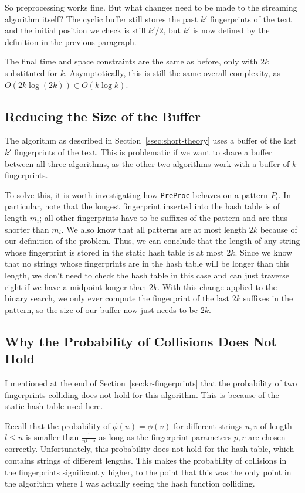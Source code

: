 \documentclass[ %
                    author={Dominic Joseph Moylett},
                    degree={MEng},
                     title={Dictionary Matching with Fingerprints},
                  subtitle={An Empirical Analysis},
                      type={research},
                      year={2015} ]{dissertation}
\begin{document}
So preprocessing works fine. But what changes need to be made to the streaming algorithm itself? The cyclic buffer still stores the past $k'$ fingerprints of the text and the initial position we check is still $k'/2$, but $k'$ is now defined by the definition in the previous paragraph.

The final time and space constraints are the same as before, only with $2k$ substituted for $k$. Asymptotically, this is still the same overall complexity, as $O(2k\log(2k)) \in O(k\log k)$.

\subsection{Reducing the Size of the Buffer}

The algorithm as described in Section~\ref{ssec:short-theory} uses a buffer of the last $k'$ fingerprints of the text. This is problematic if we want to share a buffer between all three algorithms, as the other two algorithms work with a buffer of $k$ fingerprints.

To solve this, it is worth investigating how \texttt{PreProc} behaves on a pattern $P_i$. In particular, note that the longest fingerprint inserted into the hash table is of length $m_i$; all other fingerprints have to be suffixes of the pattern and are thus shorter than $m_i$. We also know that all patterns are at most length $2k$ because of our definition of the problem. Thus, we can conclude that the length of any string whose fingerprint is stored in the static hash table is at most $2k$. Since we know that no strings whose fingerprints are in the hash table will be longer than this length, we don't need to check the hash table in this case and can just traverse right if we have a midpoint longer than $2k$. With this change applied to the binary search, we only ever compute the fingerprint of the last $2k$ suffixes in the pattern, so the size of our buffer now just needs to be $2k$.

\subsection{Why the Probability of Collisions Does Not Hold}
\label{ssec:short-collisions}

I mentioned at the end of Section~\ref{sec:kr-fingerprints} that the probability of two fingerprints colliding does not hold for this algorithm. This is because of the static hash table used here.

Recall that the probability of $\phi(u) = \phi(v)$ for different strings $u, v$ of length $l \leq n$ is smaller than $\frac{1}{n^{1 + \alpha}}$ as long as the fingerprint parameters $p, r$ are chosen correctly. Unfortunately, this probability does not hold for the hash table, which contains strings of different lengths. This makes the probability of collisions in the fingerprints significantly higher, to the point that this was the only point in the algorithm where I was actually seeing the hash function colliding.
\end{document}
